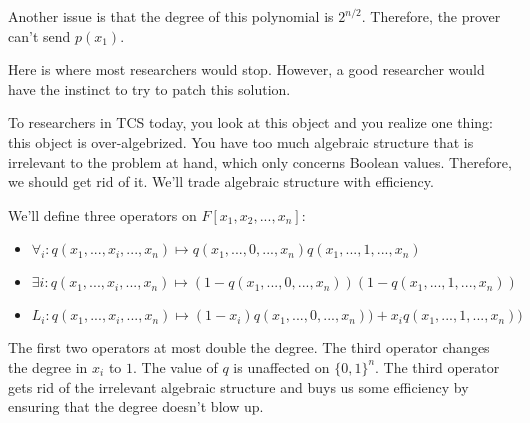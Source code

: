 \documentclass{article}
\theoremstyle{definition}
\begin{document}
Another issue is that the degree of this polynomial is $2^{n/2}$. Therefore, the prover can't send $p(x_{1})$.

Here is where most researchers would stop. However, a good researcher would have the instinct to try to patch this solution.

To researchers in TCS today, you look at this object and you realize one thing: this object is over-algebrized. You have too much algebraic structure that is irrelevant to the problem at hand, which only concerns Boolean values. Therefore, we should get rid of it. We'll trade algebraic structure with efficiency.

We'll define three operators on $F[x_{1},x_{2},...,x_{n}]$:

\begin{itemize}
    \item $\forall_{i} : q(x_{1},...,x_{i},...,x_{n}) \mapsto q(x_{1},...,0,...,x_{n})q(x_{1},...,1,...,x_{n})$

    \item $\exists{i} : q(x_{1},...,x_{i},...,x_{n}) \mapsto (1 - q(x_{1},...,0,...,x_{n}))(1 - q(x_{1},...,1,...,x_{n}))$

    \item $L_{i}: q(x_{1},...,x_{i},...,x_{n}) \mapsto (1-x_{i})q(x_{1},... ,0,...,x_{n})) + x_{i}q(x_{1},... ,1,...,x_{n}))$ 
\end{itemize}

The first two operators at most double the degree. The third operator changes the degree in $x_{i}$ to $1$. 
The value of $q$ is unaffected on $\{0,1\}^{n}$.
The third operator gets rid of the irrelevant algebraic structure 
and buys us some efficiency by ensuring that the degree doesn't blow up.
\end{document}
